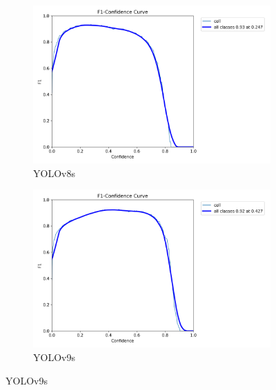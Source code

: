 \documentclass[12pt,a4paper,onecolumn,oneside]{report}
\begin{document}
\begin{figure}[H]
  \centering
  \begin{subfigure}[b]{0.48\textwidth}
    \centering
    \includegraphics[width=\textwidth]{figuras/resultados experimentacion/yolov8s/test2/BoxF1_curve.png}
    \caption{YOLOv8s}
    \label{fig:yolov8s_test2}
  \end{subfigure}
  \hfill
  \begin{subfigure}[b]{0.48\textwidth}
    \centering
    \includegraphics[width=\textwidth]{figuras/resultados experimentacion/yolov9s/test2/BoxF1_curve.png}
    \caption{YOLOv9s}
    \label{fig:yolov9s_test2}
  \end{subfigure}
  

\end{figure}
\end{document}
